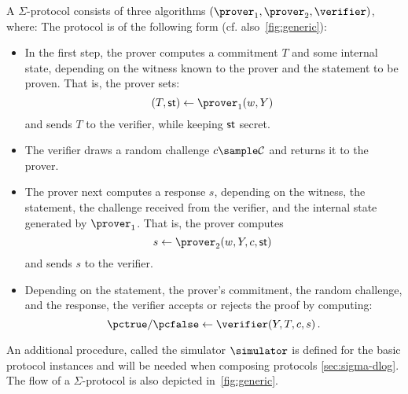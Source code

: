 \documentclass[runningheads,11pt]{article}
\begin{document}
A $\Sigma$-protocol consists of three algorithms $(\prover_1,\prover_2,\verifier)$, where:
      The protocol is of the following form (cf. also~\cref{fig:generic}):
      \begin{itemize}
        \item
          In the first step, the prover computes a commitment $T$ and some internal state, depending on the witness known to the prover and the statement to be proven.
					That is, the prover sets:
					$$(\commitment,\st) \gets \prover_1(\witness,\statement)\,$$
					and sends $T$ to the verifier, while keeping $\mathsf{st}$ secret.
        \item
          The verifier draws a random challenge $\challenge\sample\CS$ and returns it to the prover.
        \item
          The prover next computes a response $s$, depending on the witness, the statement, the challenge received from the verifier, and the internal state generated by $\prover_1$.
					That is, the prover computes
					$$s\gets\prover_2(\witness,\statement,\challenge,\st)\,$$
					and sends $s$ to the verifier.
        \item
          Depending on the statement, the prover's commitment, the random challenge, and the response, the verifier accepts or rejects the proof by computing:
					$$\accept/\reject \gets \verifier(\statement, T,\challenge,s)\,.$$
      \end{itemize}


  An additional procedure, called the simulator $\simulator$ is defined for the basic protocol instances and will be needed when composing protocols \cref{sec:sigma-dlog}.
 The flow of a $\Sigma$-protocol is also depicted in~\cref{fig:generic}.
\end{document}
